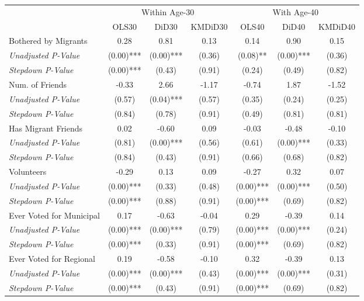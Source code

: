 \begin{tabular}{l c c c c c c}
\toprule
& \multicolumn{3}{c}{Within Age-30} & \multicolumn{3}{c}{With Age-40} \\\cmidrule(lr){2-4} \cmidrule(lr){5-7}
 & OLS30 & DiD30 & KMDiD30 & OLS40 & DiD40 & KMDiD40 \\
\midrule
Bothered by Migrants & 0.28 & 0.81 & 0.13 & 0.14 & 0.90 & 0.15 \\
\quad \textit{Unadjusted P-Value} & (0.00)*** & (0.00)*** & (0.36) & (0.08)** & (0.00)*** & (0.36) \\
\quad \textit{Stepdown P-Value} & (0.00)*** & (0.43) & (0.91) & (0.24) & (0.49) & (0.82) \\
Num. of Friends & -0.33 & 2.66 & -1.17 & -0.74 & 1.87 & -1.52 \\
\quad \textit{Unadjusted P-Value} & (0.57) & (0.04)*** & (0.57) & (0.35) & (0.24) & (0.25) \\
\quad \textit{Stepdown P-Value} & (0.84) & (0.78) & (0.91) & (0.49) & (0.81) & (0.81) \\
Has Migrant Friends & 0.02 & -0.60 & 0.09 & -0.03 & -0.48 & -0.10 \\
\quad \textit{Unadjusted P-Value} & (0.81) & (0.00)*** & (0.56) & (0.61) & (0.00)*** & (0.33) \\
\quad \textit{Stepdown P-Value} & (0.84) & (0.43) & (0.91) & (0.66) & (0.68) & (0.82) \\
Volunteers & -0.29 & 0.13 & 0.09 & -0.27 & 0.32 & 0.07 \\
\quad \textit{Unadjusted P-Value} & (0.00)*** & (0.33) & (0.48) & (0.00)*** & (0.00)*** & (0.50) \\
\quad \textit{Stepdown P-Value} & (0.00)*** & (0.88) & (0.91) & (0.00)*** & (0.69) & (0.82) \\
Ever Voted for Municipal & 0.17 & -0.63 & -0.04 & 0.29 & -0.39 & 0.14 \\
\quad \textit{Unadjusted P-Value} & (0.00)*** & (0.00)*** & (0.79) & (0.00)*** & (0.00)*** & (0.24) \\
\quad \textit{Stepdown P-Value} & (0.00)*** & (0.33) & (0.91) & (0.00)*** & (0.69) & (0.82) \\
Ever Voted for Regional & 0.19 & -0.58 & -0.10 & 0.32 & -0.39 & 0.13 \\
\quad \textit{Unadjusted P-Value} & (0.00)*** & (0.00)*** & (0.43) & (0.00)*** & (0.00)*** & (0.31) \\
\quad \textit{Stepdown P-Value} & (0.00)*** & (0.43) & (0.91) & (0.00)*** & (0.69) & (0.82) \\
\bottomrule
\end{tabular}
